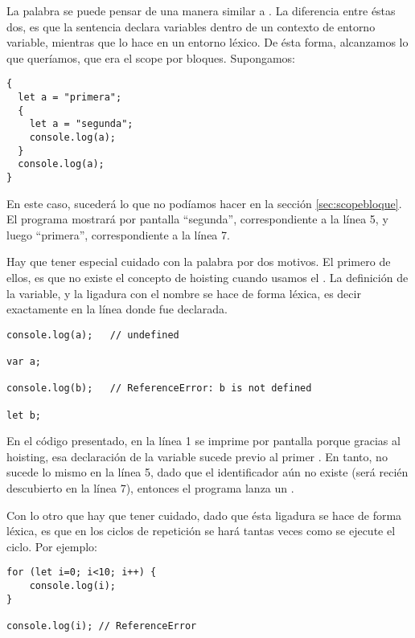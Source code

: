 \subsubsection{}

La palabra  se puede pensar de una manera similar a . La diferencia entre éstas dos, es que la sentencia  declara variables dentro de un contexto de entorno variable, mientras que  lo hace en un entorno léxico. De ésta forma, alcanzamos lo que queríamos, que era el scope por bloques. Supongamos:

\begin{lstlisting}
{
  let a = "primera";
  {
    let a = "segunda";
    console.log(a);
  }
  console.log(a);
}
\end{lstlisting}

En este caso, sucederá lo que no podíamos hacer en la sección \ref{sec:scopebloque}. El programa mostrará por pantalla "`segunda"', correspondiente a la línea 5, y luego "`primera"', correspondiente a la línea 7.

Hay que tener especial cuidado con la palabra  por dos motivos. El primero de ellos, es que no existe el concepto de hoisting cuando usamos el . La definición de la variable, y la ligadura con el nombre se hace de forma léxica, es decir exactamente en la línea donde fue declarada.

\begin{lstlisting}[title={Hoisting en \code{var} pero no en \code{let}}]
console.log(a);   // undefined

var a;

console.log(b);   // ReferenceError: b is not defined

let b;
\end{lstlisting}

En el código presentado, en la línea 1 se imprime por pantalla  porque gracias al hoisting, esa declaración de la variable  sucede previo al primer . En tanto, no sucede lo mismo en la línea 5, dado que el identificador  aún no existe (será recién descubierto en la línea 7), entonces el programa lanza un .

Con lo otro que hay que tener cuidado, dado que ésta ligadura se hace de forma léxica, es que en los ciclos de repetición se hará tantas veces como se ejecute el ciclo. Por ejemplo:

\begin{lstlisting}
for (let i=0; i<10; i++) {
	console.log(i);
}

console.log(i); // ReferenceError
\end{lstlisting}

